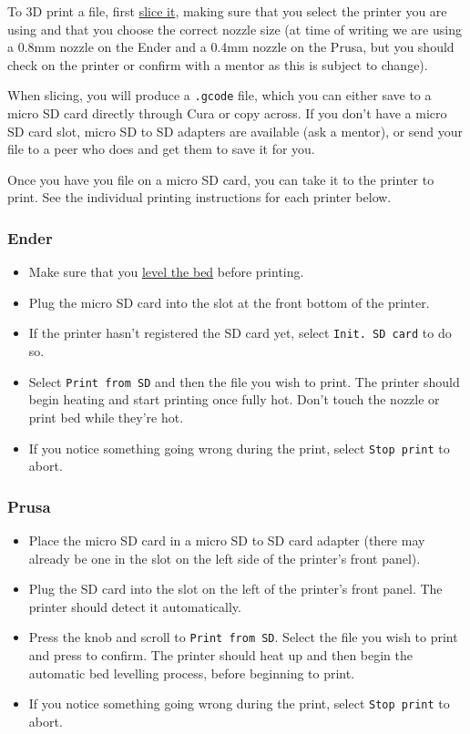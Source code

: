 \documentclass[12pt]{report}
\begin{document}
To 3D print a file, first \hyperref[sec:slicing]{slice it}, making sure that you
select the printer you are using and that you choose the correct nozzle size (at
time of writing we are using a 0.8mm nozzle on the Ender and a 0.4mm nozzle on
the Prusa, but you should check on the printer or confirm with a mentor as this
is subject to change). \par
When slicing, you will produce a \texttt{.gcode} file, which you can either save
to a micro SD card directly through Cura or copy across. If you don't have a
micro SD card slot, micro SD to SD adapters are available (ask a mentor), or
send your file to a peer who does and get them to save it for you. \par
Once you have you file on a micro SD card, you can take it to the printer to
print. See the individual printing instructions for each printer below. 

\subsubsection*{Ender}

\begin{itemize}
    \item Make sure that you \hyperref[sec:levelling]{level the bed} before
        printing.
    \item Plug the micro SD card into the slot at the front bottom of the
        printer.
    \item If the printer hasn't registered the SD card yet, select
        \texttt{Init. SD card} to do so.
    \item Select \texttt{Print from SD} and then the file you wish to
        print. The printer should begin heating and start printing once fully
        hot. Don't touch the nozzle or print bed while they're hot.
    \item If you notice something going wrong during the print, select
        \texttt{Stop print} to abort.
\end{itemize}

\subsubsection*{Prusa}

\begin{itemize}
    \item Place the micro SD card in a micro SD to SD card adapter (there may
        already be one in the slot on the left side of the printer's front
        panel).
    \item Plug the SD card into the slot on the left of the printer's front
        panel. The printer should detect it automatically.
    \item Press the knob and scroll to \texttt{Print from SD}. Select the file
        you wish to print and press to confirm. The printer should heat up and
        then begin the automatic bed levelling process, before beginning to
        print.
    \item If you notice something going wrong during the print, select
        \texttt{Stop print} to abort.
\end{itemize}
\end{document}
